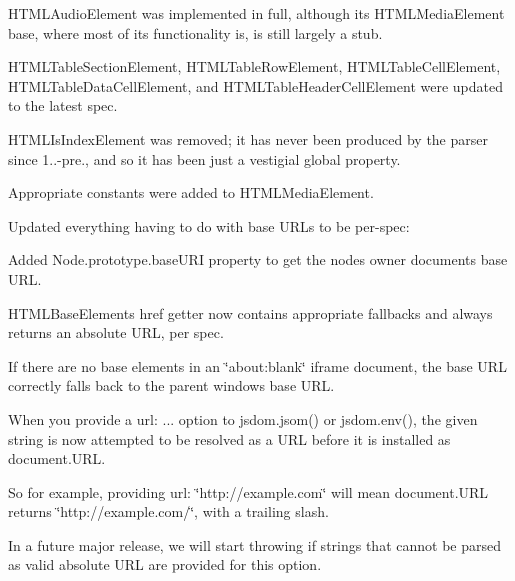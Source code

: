 \begin{DoxyItemize}
\begin{DoxyItemize}
\item {\ttfamily H\+T\+M\+L\+Audio\+Element} was implemented in full, although its {\ttfamily H\+T\+M\+L\+Media\+Element} base, where most of its functionality is, is still largely a stub.
\item {\ttfamily H\+T\+M\+L\+Table\+Section\+Element}, {\ttfamily H\+T\+M\+L\+Table\+Row\+Element}, {\ttfamily H\+T\+M\+L\+Table\+Cell\+Element}, {\ttfamily H\+T\+M\+L\+Table\+Data\+Cell\+Element}, and {\ttfamily H\+T\+M\+L\+Table\+Header\+Cell\+Element} were updated to the latest spec.
\item {\ttfamily H\+T\+M\+L\+Is\+Index\+Element} was removed; it has never been produced by the parser since 1..-\/pre., and so it has been just a vestigial global property.
\item Appropriate constants were added to {\ttfamily H\+T\+M\+L\+Media\+Element}.
\end{DoxyItemize}
\item Updated everything having to do with base U\+R\+Ls to be per-\/spec\+:
\begin{DoxyItemize}
\item Added {\ttfamily Node.\+prototype.\+base\+U\+RI} property to get the node\textquotesingle{}s owner document\textquotesingle{}s base U\+RL.
\item {\ttfamily H\+T\+M\+L\+Base\+Element}\textquotesingle{}s {\ttfamily href} getter now contains appropriate fallbacks and always returns an absolute U\+RL, per spec.
\item If there are no {\ttfamily base} elements in an {\ttfamily \char`\"{}about\+:blank\char`\"{}} iframe document, the base U\+RL correctly falls back to the parent window\textquotesingle{}s base U\+RL.
\end{DoxyItemize}
\item When you provide a {\ttfamily url\+: ...} option to {\ttfamily jsdom.\+jsom()} or {\ttfamily jsdom.\+env()}, the given string is now attempted to be resolved as a U\+RL before it is installed as {\ttfamily document.\+U\+RL}.
\begin{DoxyItemize}
\item So for example, providing {\ttfamily url\+: \char`\"{}http\+://example.\+com\char`\"{}} will mean {\ttfamily document.\+U\+RL} returns {\ttfamily \char`\"{}http\+://example.\+com/\char`\"{}}, with a trailing slash.
\item In a future major release, we will start throwing if strings that cannot be parsed as valid absolute U\+RL are provided for this option.
\end{DoxyItemize}
\end{DoxyItemize}

